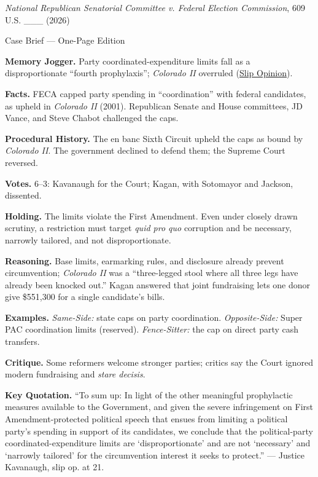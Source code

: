 \documentclass[12pt]{article}
\begin{document}
\begin{center}
{\Large \textit{National Republican Senatorial Committee v. Federal Election Commission}, 609 U.S. \_\_\_ (2026)\par}
\vspace{0.3em}
{\normalsize Case Brief --- One-Page Edition\par}
\end{center}

\textbf{Memory Jogger.} Party coordinated-expenditure limits fall as a disproportionate ``fourth prophylaxis''; \textit{Colorado II} overruled (\href{https://www.supremecourt.gov/opinions/25pdf/24-621_h315.pdf}{Slip Opinion}).

\textbf{Facts.} FECA capped party spending in ``coordination'' with federal candidates, as upheld in \textit{Colorado II} (2001). Republican Senate and House committees, JD Vance, and Steve Chabot challenged the caps.

\textbf{Procedural History.} The en banc Sixth Circuit upheld the caps as bound by \textit{Colorado II}. The government declined to defend them; the Supreme Court reversed.

\textbf{Votes.} 6--3: Kavanaugh for the Court; Kagan, with Sotomayor and Jackson, dissented.

\textbf{Holding.} The limits violate the First Amendment. Even under closely drawn scrutiny, a restriction must target \textit{quid pro quo} corruption and be necessary, narrowly tailored, and not disproportionate.

\textbf{Reasoning.} Base limits, earmarking rules, and disclosure already prevent circumvention; \textit{Colorado II} was a ``three-legged stool where all three legs have already been knocked out.'' Kagan answered that joint fundraising lets one donor give \$551,300 for a single candidate's bills.

\textbf{Examples.} \emph{Same-Side:} state caps on party coordination. \emph{Opposite-Side:} Super PAC coordination limits (reserved). \emph{Fence-Sitter:} the cap on direct party cash transfers.

\textbf{Critique.} Some reformers welcome stronger parties; critics say the Court ignored modern fundraising and \textit{stare decisis}.

\textbf{Key Quotation.} ``To sum up: In light of the other meaningful prophylactic measures available to the Government, and given the severe infringement on First Amendment-protected political speech that ensues from limiting a political party's spending in support of its candidates, we conclude that the political-party coordinated-expenditure limits are `disproportionate' and are not `necessary' and `narrowly tailored' for the circumvention interest it seeks to protect.'' --- Justice Kavanaugh, slip op. at 21.
\end{document}

